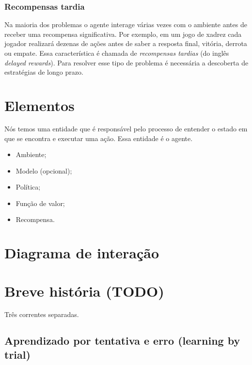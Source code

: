 \documentclass{article}
\begin{document}
            \subsubsection{Recompensas tardia}
        
                Na maioria dos problemas o agente interage várias vezes com o ambiente antes de receber uma recompensa significativa. Por exemplo, em um jogo de xadrez cada jogador realizará dezenas de ações antes de saber a resposta final, vitória, derrota ou empate. Essa característica é chamada de \emph{recompensas tardias} (do inglês \emph{delayed rewards}). Para resolver esse tipo de problema é necessária a descoberta de estratégias de longo prazo.
        
    \section{Elementos}
    
        Nós temos uma entidade que é responsável pelo processo de entender o estado em que se encontra e executar uma ação. Essa entidade é o agente. 
    
        \begin{itemize}
            \item Ambiente;
            \item Modelo (opcional);
            \item Política;
            \item Função de valor;
            \item Recompensa.
        \end{itemize}
        
    \section{Diagrama de interação}
    
        \begin{center}
            \rlinteraction
        \end{center}
    
    \section{Breve história (TODO)}
    
        Três correntes separadas.
        
        \subsection{Aprendizado por tentativa e erro (learning by trial)}
        
\end{document}

